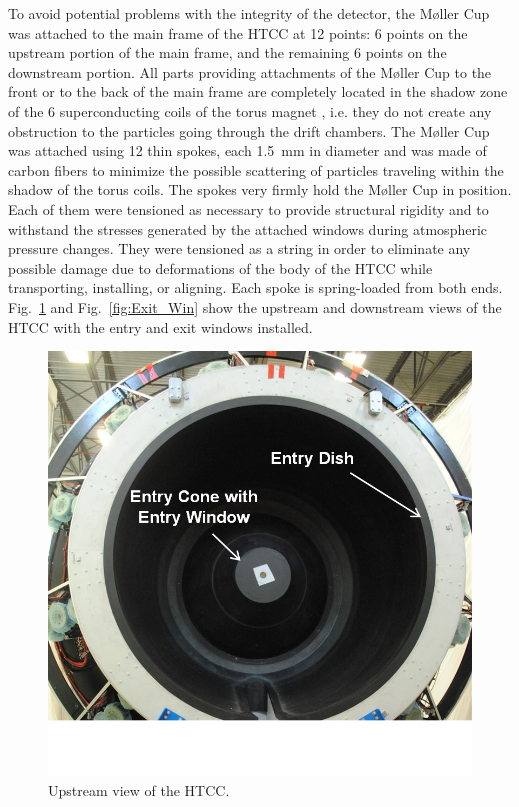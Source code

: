 To avoid potential problems with the integrity of the detector, the M{\o}ller Cup was attached to the main frame
of the HTCC at 12 points: 6 points on the upstream portion of the main frame, and the remaining 6 points on the
downstream portion. All parts providing attachments of the M{\o}ller Cup to the front or to the back of the main
frame are completely located in the shadow zone of the 6 superconducting coils of the torus magnet
\cite{magnets-nim}, i.e. they do not create any obstruction to the particles going through the drift chambers. The
M{\o}ller Cup was attached using 12 thin spokes, each 1.5~mm in diameter and was made of carbon fibers to minimize
the possible scattering of particles traveling within the shadow of the torus coils. The spokes very firmly hold the
M{\o}ller Cup in position. Each of them were tensioned as necessary to provide structural rigidity and to withstand
the stresses generated by the attached windows during atmospheric pressure changes. They were tensioned as a
string in order to eliminate any possible damage due to deformations of the body of the HTCC while
transporting, installing, or aligning. Each spoke is spring-loaded from both ends. Fig.~\ref{fig:Front_View} and
Fig.~\ref{fig:Exit_Win} show the upstream and downstream views of the HTCC with the entry and exit windows
installed.

\begin{figure}[ht]
    \centering
    \includegraphics[width=1.0\linewidth,trim={0 2.5cm 0 0},clip]{images/Front_View}
    \caption{Upstream view of the HTCC.}
    \label{fig:Front_View}
\end{figure}

